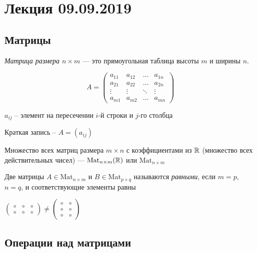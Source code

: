 \section{Лекция 09.09.2019}
\subsection{Матрицы}
\begin{definition}
    \textit{Матрица размера $n \times m$} --- это прямоугольная таблица высоты $m$ и ширины $n$.
\end{definition}

\begin{equation*}
    A = \begin{pmatrix}
        a_{11}  & a_{12} & \dots & a_{1n} \\
        a_{21} & a_{22} & \dots & a_{2n} \\
        \vdots & \vdots & \ddots & \vdots \\
        a_{m1} & a_{m2} & \dots & a_{mn}
    \end{pmatrix}
\end{equation*}

$a_{ij}$ -- элемент на пересечении $i$-й строки и $j$-го столбца

Краткая запись -- $A = (a_{ij})$

Множество всех матриц размера $m \times n$ с коэффициентами из $\mathbb{R}$ (множество всех действительных чисел) --- $\text{Mat}_{n \times m}(\mathbb{R})$ или $\text{Mat}_{n \times m}$

\begin{definition}
    Две матрицы $A \in \text{Mat}_{n \times m}$ и $B \in \text{Mat}_{p \times q}$ называются \textit{равными}, если $m = p$, $n = q$, и соответствующие элементы равны
\end{definition}

\begin{example}
    $\begin{pmatrix}
       \circ & \circ & \circ \\ \circ & \circ & \circ
    \end{pmatrix}
    \neq
    \begin{pmatrix}
        \circ & \circ \\ \circ & \circ \\ \circ & \circ
    \end{pmatrix}$
\end{example}

\subsection{Операции над матрицами}

